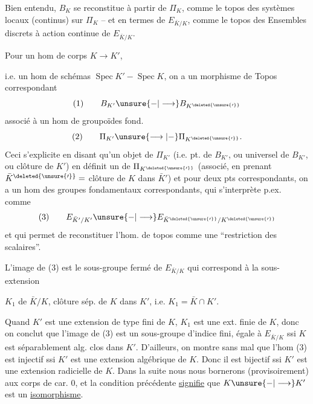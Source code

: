 Bien entendu, $B_K$ se reconstitue à partir de $\Pi_K$, comme le topos des systèmes locaux (continus) sur $\Pi_K$ -- et en termes de $E_{\bar K/K}$, comme le topos des Ensembles discrets à action continue de $E_{\bar K/K}$.

Pour un hom de corps $K\longrightarrow K'$,

i.e. un hom de schémas $\operatorname{Spec}K' - \operatorname{Spec}K$, on a un morphisme de Topos correspondant
\[
(1)\qquad B_{K'}\unsure{-|\longrightarrow}B_{K^{\deleted{\unsure{\prime}}}}
\]
associé à un hom de groupoïdes fond.
\[
(2)\qquad \Pi_{K'}\unsure{\longrightarrow|-}\Pi_{K^{\deleted{\unsure{\prime}}}}.
\]
Ceci s'explicite en disant qu'un  objet de $\Pi_{K'}$ (i.e. pt. de $B_{K'}$, ou  universel de $B_{K'}$, \deleted{)} ou clôture  de $K'$) en définit un de $\Pi_{K^{\deleted{\unsure{\prime}}}}$ (associé, en prenant $\bar K^{\deleted{\unsure{\prime}}}=$ clôture  de $K$ dans $\bar K'$) et pour deux pts correspondants, on a un hom des groupes fondamentaux correspondants, qui s'interprète p.ex. comme
\[
(3)\qquad E_{\bar K'/K'}\unsure{-|\longrightarrow}E_{\bar K^{\deleted{\unsure{\prime}}}/K^{\deleted{\unsure{\prime}}}}
\]
et qui permet de reconstituer l'hom. de topos comme une ``restriction des scalaires''.

L'image de (3) est le sous-groupe fermé de $E_{\bar K/K}$ qui correspond à la sous-extension

$K_1$ de $\bar K/K$, clôture  sép. de $K$ dans $K'$, i.e. $K_1=\bar K\cap K'$.

Quand $K'$ est une extension de type fini de $K$, $K_1$ est une ext. finie de $K$, donc on conclut que l'image de (3) est  un sous-groupe d'indice fini, égale à $E_{\bar K/K}$ ssi  $K$ est séparablement alg. clos dans $K'$. D'ailleurs, on montre sans mal que  l'hom (3) est injectif ssi $K'$ est une extension algébrique de $K$. Donc il est bijectif ssi $K'$ est une extension radicielle de $K$. Dans la suite nous nous bornerons (provisoirement) aux corps de car. $0$, et la condition précédente \uline{signifie}  que $K\unsure{-|\longrightarrow}K'$ est un \uline{isomorphisme}.

